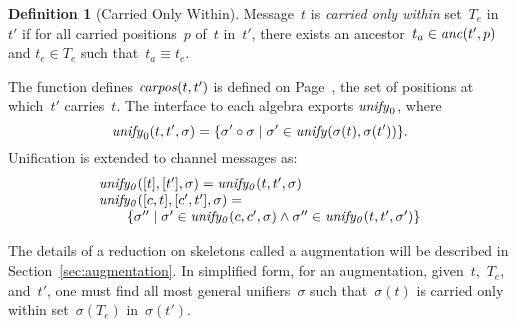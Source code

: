 \documentclass[12pt]{report}
\theoremstyle{definition}
\newtheorem{defn}{Definition}[chapter]
\begin{document}
\begin{defn}[Carried Only Within]\label{def:cow}
Message~$t$ is \emph{carried only within}
set~$T_e$ in~$t'$ if for all carried
positions~$p$ of~$t$ in~$t'$, there exists an
ancestor~$t_a\in\operatorname{\mathit{anc}}(t',p)$ and $t_e\in T_e$ such that~$t_a\equiv
t_e$.
\end{defn}

The function defines $\operatorname{\mathit{carpos}}(t,t')$ is defined on
Page~\pageref{def:carried positions}, the set of positions at
which~$t'$ carries~$t$.  The interface to each algebra exports
$\operatorname{\mathit{unify}}_0$, where
$$\operatorname{\mathit{unify}}_0(t,t',\sigma)=\{\sigma'\circ\sigma\mid
\sigma'\in\operatorname{\mathit{unify}}(\sigma(t),\sigma(t'))\}.$$
Unification is extended to channel messages as:
\[\begin{array}{l}
\operatorname{\mathit{unify_0}}([t],[t'],\sigma)=\operatorname{\mathit{unify_0}}(t,t',\sigma)\\
\operatorname{\mathit{unify_0}}([c,t],[c',t'],\sigma)=\\
\qquad\{\sigma''\mid\sigma'\in\operatorname{\mathit{unify_0}}(c,c',\sigma)\land
\sigma''\in\operatorname{\mathit{unify_0}}(t,t',\sigma')\}
\end{array}\]

The details of a reduction on skeletons called a augmentation will be
described in Section~\ref{sec:augmentation}.  In simplified form, for
an augmentation, given~$t$,~$T_e$, and~$t'$, one must find all most
general unifiers~$\sigma$ such that~$\sigma(t)$ is carried only within
set~$\sigma(T_e)$ in~$\sigma(t')$.
\end{document}
